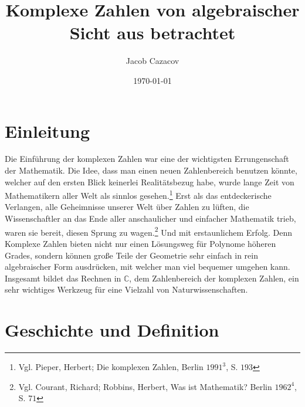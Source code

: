 \documentclass[a4paper,12pt]{article} %
\author{Jacob Cazacov}
\title{Komplexe Zahlen von algebraischer Sicht aus betrachtet}
\date{\today}
\begin{document}

\maketitle

\thispagestyle{empty}

\newpage

\thispagestyle{empty}


\tableofcontents

\newpage


\section{Einleitung}

Die Einführung der komplexen Zahlen war eine der wichtigsten Errungenschaft der Mathematik.
Die Idee, dass man einen neuen Zahlenbereich benutzen könnte, welcher auf den ersten Blick keinerlei Realitätsbezug habe, wurde lange Zeit von Mathematikern aller Welt als sinnlos gesehen.\footnote{Vgl. Pieper, Herbert; Die komplexen Zahlen, Berlin $1991^3$, S. $193$}
Erst als das entdeckerische Verlangen, alle Geheimnisse unserer Welt über Zahlen zu lüften, die Wissenschaftler an das Ende aller anschaulicher und einfacher Mathematik trieb, waren sie bereit, diesen Sprung zu wagen.\footnote{Vgl. Courant, Richard; Robbins, Herbert, Was ist Mathematik? Berlin $1962^4$, S. $71$}
Und mit erstaunlichem Erfolg.
Denn Komplexe Zahlen bieten nicht nur einen Lösungsweg für Polynome höheren Grades, sondern können große Teile der Geometrie sehr einfach in rein algebraischer Form ausdrücken, mit welcher man viel bequemer umgehen kann.
Insgesamt bildet das Rechnen in $\mathbb{C}$, dem Zahlenbereich der komplexen Zahlen, ein sehr wichtiges Werkzeug für eine Vielzahl von Naturwissenschaften.

\section{Geschichte und Definition}
\end{document}
